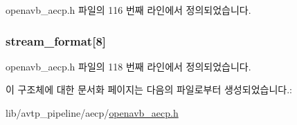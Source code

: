 openavb\+\_\+aecp.\+h 파일의 116 번째 라인에서 정의되었습니다.

\subsubsection[{\texorpdfstring{stream\+\_\+format}{stream_format}}]{ stream\+\_\+format\mbox{[}8\mbox{]}}\hypertarget{structopenavb__aecp__commandresponse__data__set__stream__format__t_a574c1a5d46fe953da8f394d622e1da8e}{}\label{structopenavb__aecp__commandresponse__data__set__stream__format__t_a574c1a5d46fe953da8f394d622e1da8e}


openavb\+\_\+aecp.\+h 파일의 118 번째 라인에서 정의되었습니다.



이 구조체에 대한 문서화 페이지는 다음의 파일로부터 생성되었습니다.\+:\begin{DoxyCompactItemize}
\item 
lib/avtp\+\_\+pipeline/aecp/\hyperlink{openavb__aecp_8h}{openavb\+\_\+aecp.\+h}\end{DoxyCompactItemize}
